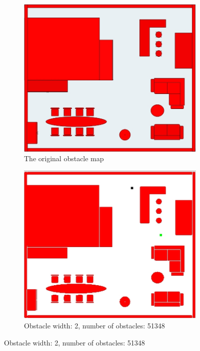 \begin{enumerate}

\begin{figure}[!h]
	\begin{subfigure}[t]{.5\textwidth}
		\centering
		\includegraphics[width=.95\linewidth]{figures/real_map.jpg}
		\caption{The original obstacle map}
		\label{fig:obsmap_sfig1}
	\end{subfigure}%
	\begin{subfigure}[t]{.5\textwidth}
		\centering
		\includegraphics[width=.95\linewidth]{figures/obs_width_2_total_obs_51348.jpg}
		\caption{Obstacle width: 2, number of obstacles: 51348}
		\label{fig:obsmap_sfig2}
	\end{subfigure}%
\end{figure}


\end{enumerate}
